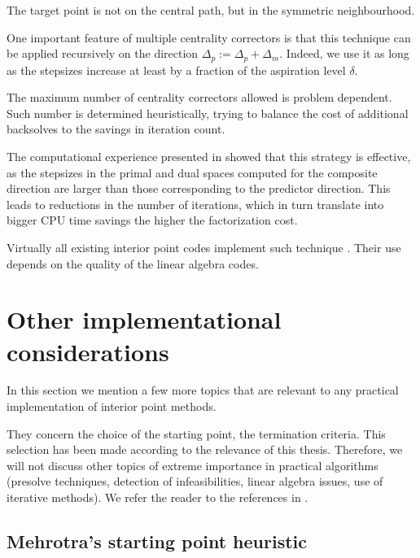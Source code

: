 The target point is not on the central path, but in the symmetric
neighbourhood.

One important feature of multiple centrality correctors is that 
this technique can be applied recursively on the direction 
$\Delta_p := \Delta_p + \Delta_m$.
Indeed, we use it as long as the stepsizes increase 
at least by a fraction of the aspiration level $\delta$.

The maximum number of centrality correctors allowed is
problem dependent. Such number is determined 
heuristically, trying to balance the cost of additional backsolves to 
the savings in iteration count.

The computational experience presented in \cite{Gondzio96} showed 
that this strategy is effective, as the stepsizes in the primal and 
dual spaces computed for the composite direction are larger than 
those corresponding to the predictor direction. 
This leads to reductions in the number of iterations, which in turn 
translate into bigger CPU time savings the higher the factorization
cost.

Virtually all existing interior point codes implement such technique 
\cite[Appendix B]{ipm:Wright97}.
Their use depends on the quality of the linear algebra codes.

%
%
\section{Other implementational considerations}

In this section we mention a few more topics that are relevant to any 
practical implementation of interior point methods.

They concern the choice of the starting point, the termination
criteria. This selection has been made according to the relevance
of this thesis.
Therefore, we will not discuss other topics of extreme importance 
in practical algorithms (presolve techniques, detection of infeasibilities, 
linear algebra issues, use of iterative methods).
We refer the reader to the references in 
\cite{AndersenGondzioMeszarosXu,GondzioTerlaky}.


%
%
\subsection{Mehrotra's starting point heuristic}
\label{sec:StartingPoint}

